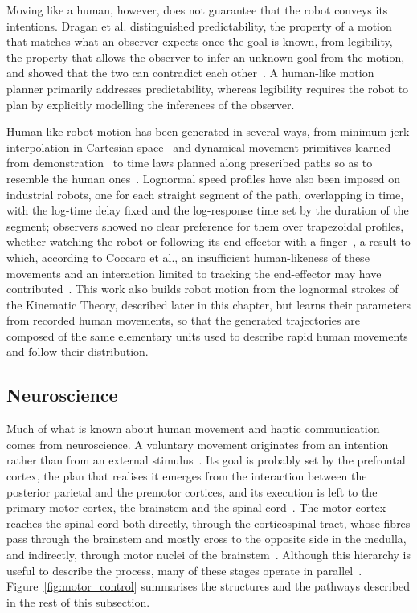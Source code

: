 \documentclass[12pt]{report}
\begin{document}
Moving like a human, however, does not guarantee that the robot conveys its intentions. Dragan et al. distinguished predictability, the property of a motion that matches what an observer expects once the goal is known, from legibility, the property that allows the observer to infer an unknown goal from the motion, and showed that the two can contradict each other~\cite{dragan2013}. A human-like motion planner primarily addresses predictability, whereas legibility requires the robot to plan by explicitly modelling the inferences of the observer.

Human-like robot motion has been generated in several ways, from minimum-jerk interpolation in Cartesian space~\cite{huber2008} and dynamical movement primitives learned from demonstration~\cite{ijspeert2013} to time laws planned along prescribed paths so as to resemble the human ones~\cite{coccaro}. Lognormal speed profiles have also been imposed on industrial robots, one for each straight segment of the path, overlapping in time, with the log-time delay fixed and the log-response time set by the duration of the segment; observers showed no clear preference for them over trapezoidal profiles, whether watching the robot or following its end-effector with a finger~\cite{quintana2022}, a result to which, according to Coccaro et al., an insufficient human-likeness of these movements and an interaction limited to tracking the end-effector may have contributed~\cite{coccaro}. This work also builds robot motion from the lognormal strokes of the Kinematic Theory, described later in this chapter, but learns their parameters from recorded human movements, so that the generated trajectories are composed of the same elementary units used to describe rapid human movements and follow their distribution.

\subsection{Neuroscience}
Much of what is known about human movement and haptic communication comes from neuroscience. A voluntary movement originates from an intention rather than from an external stimulus~\cite[p.~816]{scott2021}. Its goal is probably set by the prefrontal cortex, the plan that realises it emerges from the interaction between the posterior parietal and the premotor cortices, and its execution is left to the primary motor cortex, the brainstem and the spinal cord~\cite[p.~710]{kandel2021}. The motor cortex reaches the spinal cord both directly, through the corticospinal tract, whose fibres pass through the brainstem and mostly cross to the opposite side in the medulla, and indirectly, through motor nuclei of the brainstem~\cites[p.~89]{amaral2021}[p.~857]{scott2021}. Although this hierarchy is useful to describe the process, many of these stages operate in parallel~\cite[p.~710]{kandel2021}. Figure~\ref{fig:motor_control} summarises the structures and the pathways described in the rest of this subsection.
\end{document}
